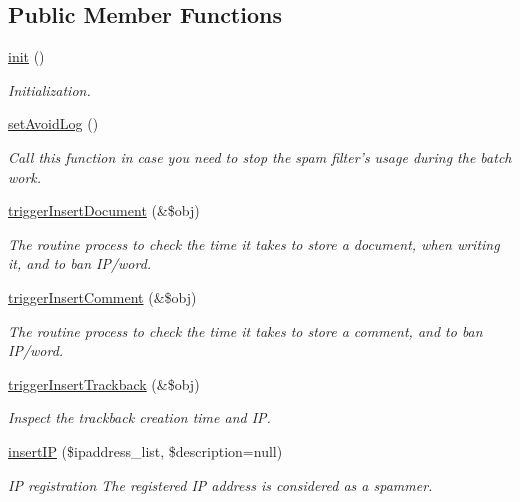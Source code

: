 \subsection*{Public Member Functions}
\begin{DoxyCompactItemize}
\item 
\hyperlink{classspamfilterController_a8204da601e789d60dbdfe0f692537e70}{init} ()
\begin{DoxyCompactList}\small\item\em Initialization. \end{DoxyCompactList}\item 
\hyperlink{classspamfilterController_a31282e59e182dca5e3f94e4c9122578d}{set\+Avoid\+Log} ()
\begin{DoxyCompactList}\small\item\em Call this function in case you need to stop the spam filter's usage during the batch work. \end{DoxyCompactList}\item 
\hyperlink{classspamfilterController_a9ed78c37a603b06cb067ecdc523a2ae4}{trigger\+Insert\+Document} (\&\$obj)
\begin{DoxyCompactList}\small\item\em The routine process to check the time it takes to store a document, when writing it, and to ban I\+P/word. \end{DoxyCompactList}\item 
\hyperlink{classspamfilterController_ac01aa63960909cc5c95bfae15ded5d99}{trigger\+Insert\+Comment} (\&\$obj)
\begin{DoxyCompactList}\small\item\em The routine process to check the time it takes to store a comment, and to ban I\+P/word. \end{DoxyCompactList}\item 
\hyperlink{classspamfilterController_ace7cf6178aa16638526af5d73a9554eb}{trigger\+Insert\+Trackback} (\&\$obj)
\begin{DoxyCompactList}\small\item\em Inspect the trackback creation time and I\+P. \end{DoxyCompactList}\item 
\hyperlink{classspamfilterController_aab95351e0ebeffec58d24354aa92e3f5}{insert\+I\+P} (\$ipaddress\+\_\+list, \$description=null)
\begin{DoxyCompactList}\small\item\em I\+P registration The registered I\+P address is considered as a spammer. \end{DoxyCompactList}\item 

\end{DoxyCompactItemize}
